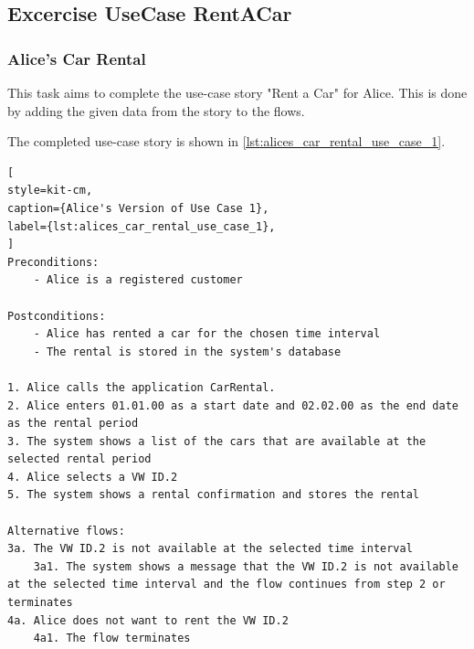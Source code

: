 \subsection{Excercise UseCase RentACar}
\label{sec:exercise_use_case_rent_a_car}
\subsubsection*{Alice's Car Rental}
This task aims to complete the use-case story "Rent a Car" for Alice.
This is done by adding the given data from the story to the flows.

The completed use-case story is shown in \autoref{lst:alices_car_rental_use_case_1}.

\begin{lstlisting}[
style=kit-cm,
caption={Alice's Version of Use Case 1},
label={lst:alices_car_rental_use_case_1},
]
Preconditions:
    - Alice is a registered customer

Postconditions:
    - Alice has rented a car for the chosen time interval
    - The rental is stored in the system's database

1. Alice calls the application CarRental.
2. Alice enters 01.01.00 as a start date and 02.02.00 as the end date as the rental period
3. The system shows a list of the cars that are available at the selected rental period
4. Alice selects a VW ID.2
5. The system shows a rental confirmation and stores the rental

Alternative flows:
3a. The VW ID.2 is not available at the selected time interval
    3a1. The system shows a message that the VW ID.2 is not available at the selected time interval and the flow continues from step 2 or terminates
4a. Alice does not want to rent the VW ID.2
    4a1. The flow terminates
\end{lstlisting}
